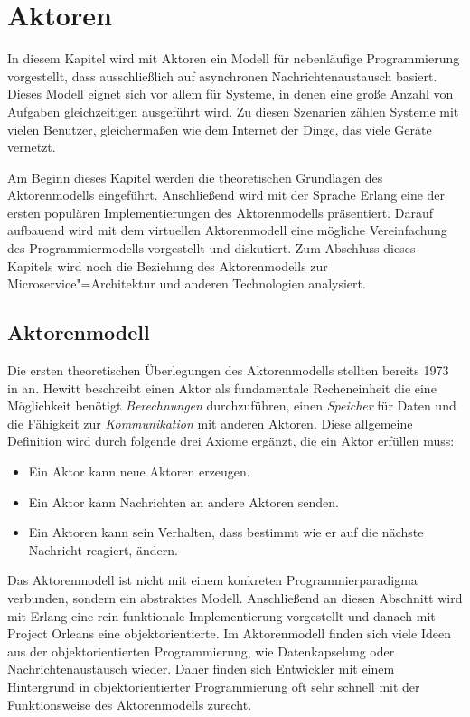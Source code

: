 \chapter{Aktoren}

In diesem Kapitel wird mit Aktoren ein Modell für nebenläufige Programmierung vorgestellt, dass ausschließlich auf asynchronen Nachrichtenaustausch basiert. Dieses Modell eignet sich vor allem für Systeme, in denen eine große Anzahl von Aufgaben gleichzeitigen ausgeführt wird. Zu diesen Szenarien zählen Systeme mit vielen Benutzer, gleichermaßen wie dem Internet der Dinge, das viele Geräte vernetzt.

Am Beginn dieses Kapitel werden die theoretischen Grundlagen des Aktorenmodells eingeführt. Anschließend wird mit der Sprache Erlang eine der ersten populären Implementierungen des Aktorenmodells präsentiert. Darauf aufbauend wird mit dem virtuellen Aktorenmodell eine mögliche Vereinfachung des Programmiermodells vorgestellt und diskutiert. Zum Abschluss dieses Kapitels wird noch die Beziehung des Aktorenmodells zur Microservice"=Architektur und anderen Technologien analysiert.

\section{Aktorenmodell}
\label{sec:actor-model}

Die ersten theoretischen Überlegungen des Aktorenmodells stellten \citeauthor{Hewitt:1973:UMA:1624775.1624804} bereits 1973 in \cite{Hewitt:1973:UMA:1624775.1624804} an. Hewitt beschreibt einen Aktor als fundamentale Recheneinheit die eine Möglichkeit benötigt \textit{Berechnungen} durchzuführen, einen \textit{Speicher} für Daten und die Fähigkeit zur \textit{Kommunikation} mit anderen Aktoren. Diese allgemeine Definition wird durch folgende drei Axiome ergänzt, die ein Aktor erfüllen muss:

\begin{itemize}
	\item Ein Aktor kann neue Aktoren erzeugen.
	\item Ein Aktor kann Nachrichten an andere Aktoren senden.
	\item Ein Aktoren kann sein Verhalten, dass bestimmt wie er auf die nächste Nachricht reagiert, ändern.
\end{itemize}

\noindent
Das Aktorenmodell ist nicht mit einem konkreten Programmierparadigma verbunden, sondern ein abstraktes Modell. Anschließend an diesen Abschnitt wird mit Erlang eine rein funktionale Implementierung vorgestellt und danach mit Project Orleans eine objektorientierte. Im Aktorenmodell finden sich viele Ideen aus der objektorientierten Programmierung, wie \zB Datenkapselung oder Nachrichtenaustausch wieder. Daher finden sich Entwickler mit einem Hintergrund in objektorientierter Programmierung oft sehr schnell mit der Funktionsweise des Aktorenmodells zurecht.


